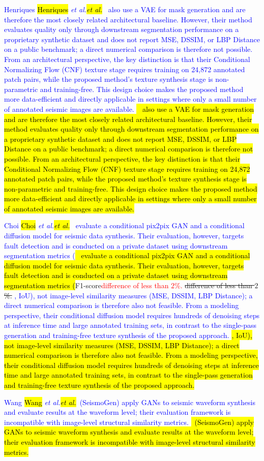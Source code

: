 \documentclass{ieeeaccess}
\makeatletter
\providecommand{\DIFaddbegin}{} %
\providecommand{\DIFaddend}{} %
\providecommand{\DIFdelbegin}{} %
\providecommand{\DIFdelend}{} %
\newcommand{\DIFscaledelfig}{0.5}
\newlength{\DIFdelgraphicswidth} %
\newlength{\DIFdelgraphicsheight} %
\newcommand{\DIFaddincludegraphics}[2][]{{\color{blue}\fbox{\DIFOincludegraphics[#1]{#2}}}} %
\newcommand{\DIFdelincludegraphics}[2][]{%
\sbox{\DIFdelgraphicsbox}{\DIFOincludegraphics[#1]{#2}}%
\settoboxwidth{\DIFdelgraphicswidth}{\DIFdelgraphicsbox} %
\settoboxtotalheight{\DIFdelgraphicsheight}{\DIFdelgraphicsbox} %
\scalebox{\DIFscaledelfig}{%
\parbox[b]{\DIFdelgraphicswidth}{\usebox{\DIFdelgraphicsbox}\\[-\baselineskip] \rule{\DIFdelgraphicswidth}{0em}}\llap{\resizebox{\DIFdelgraphicswidth}{\DIFdelgraphicsheight}{%
\setlength{\unitlength}{\DIFdelgraphicswidth}%
\begin{picture}(1,1)%
\thicklines\linethickness{2pt} %
{\color[rgb]{1,0,0}\put(0,0){\framebox(1,1){}}}%
{\color[rgb]{1,0,0}\put(0,0){\line( 1,1){1}}}%
{\color[rgb]{1,0,0}\put(0,1){\line(1,-1){1}}}%
\end{picture}%
}\hspace*{3pt}}} %
} %
\DeclareRobustCommand{\DIFaddbegin}{\DIFOaddbegin \let\includegraphics\DIFaddincludegraphics} %
\DeclareRobustCommand{\DIFaddend}{\DIFOaddend \let\includegraphics\DIFOincludegraphics} %
\DeclareRobustCommand{\DIFdelbegin}{\DIFOdelbegin \let\includegraphics\DIFdelincludegraphics} %
\DeclareRobustCommand{\DIFdelend}{\DIFOaddend \let\includegraphics\DIFOincludegraphics} %
\let\sout@orig\sout %
\renewcommand{\sout}[1]{\ifmmode\text{\sout@orig{\ensuremath{#1}}}\else\sout@orig{#1}\fi} %
\providecommand{\DIFadd}[1]{\ifmmode\textcolor{blue}{#1}\else\hl{#1}\fi}
\providecommand{\DIFdel}[1]{\ifmmode\textcolor{red}{#1}\else\sout{#1}\fi}
\renewcommand{\DIFadd}[1]{\ifmmode\textcolor{blue}{#1}\else\hl{#1}\fi}
\renewcommand{\DIFdel}[1]{\ifmmode\textcolor{red}{#1}\else\sout{#1}\fi}
\makeatother
\begin{document}
\DIFadd{Henriques }\emph{\DIFadd{et al.}}\DIFadd{~\cite{Henriques2021} also use a VAE for mask generation and are therefore the most closely related architectural baseline. However, their method evaluates quality only through downstream segmentation performance on a proprietary synthetic dataset and does not report MSE, DSSIM, or LBP Distance on a public benchmark; a direct numerical comparison is therefore not possible. From an architectural perspective, the key distinction is that their Conditional Normalizing Flow (CNF) texture stage requires training on 24,872 annotated patch pairs, while the proposed method's texture synthesis stage is non-parametric and training-free. This design choice makes the proposed method more data-efficient and directly applicable in settings where only a small number of annotated seismic images are available.
}

\DIFadd{Choi }\emph{\DIFadd{et al.}}\DIFadd{~\cite{Choi2025} evaluate a conditional pix2pix GAN and a conditional diffusion model for seismic data synthesis. Their evaluation, however, targets fault detection and is conducted on a private dataset using downstream segmentation metrics (}\DIFaddend F1-score\DIFdelbegin \DIFdel{difference of less than $2$\%. }\DIFdelend \DIFaddbegin \DIFadd{, IoU), not image-level similarity measures (MSE, DSSIM, LBP Distance); a direct numerical comparison is therefore also not feasible. From a modeling perspective, their conditional diffusion model requires hundreds of denoising steps at inference time and large annotated training sets, in contrast to the single-pass generation and training-free texture synthesis of the proposed approach.
}

\DIFadd{Wang }\emph{\DIFadd{et al.}}\DIFadd{~\cite{Wang2021}(SeismoGen) apply GANs to seismic waveform synthesis and evaluate results at the waveform level; their evaluation framework is incompatible with image-level structural similarity metrics.
}
\end{document}
